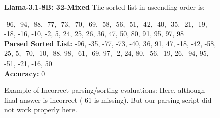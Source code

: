 \begin{figure*}
\begin{AIbox}{\bf{\large Llama-3.1-8B: 32-Mixed}}
The sorted list in ascending order is:

-96, -94, -88, -77, -73, -70, -69, -58, -56, -51, -42, -40, -35, -21, -19, -18, -16, -10, -2, 5, 24, 25, 26, 36, 47, 50, 80, 91, 95, 97, 98
\\

\textbf{Parsed Sorted List:}
-96, -35, -77, -73, -40, 36, 91, 47, -18, -42, -58, 25, 5, -70, -10, -88, 98, -61, -69, 97, -2, 24, 80, -56, -19, 26, -94, 95, -51, -21, -16, 50
\\

\textbf{Accuracy:} 0


\end{AIbox}
\caption{Example of Incorrect parsing/sorting evaluations: Here, although final answer is incorrect (-61 is missing). But our parsing script did not work properly here.}
\end{figure*}
